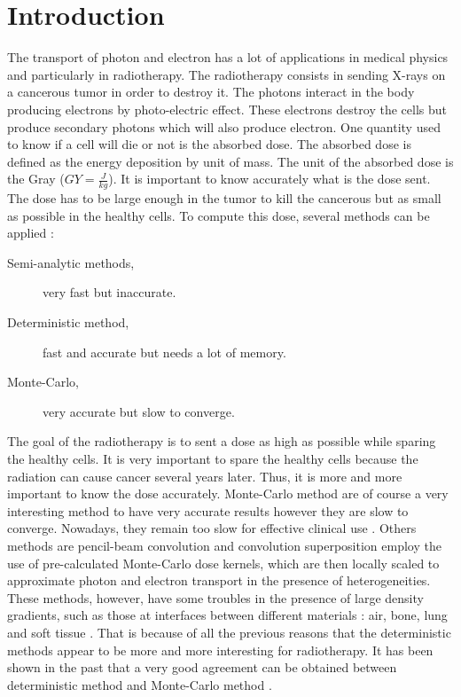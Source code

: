 \section{Introduction}
The transport of photon and electron has a lot of applications in medical
physics and particularly in radiotherapy. The radiotherapy consists in sending
X-rays on a cancerous tumor in order to destroy it. The photons interact in the
body producing electrons by photo-electric effect. These electrons destroy the
cells but produce secondary photons which will also produce electron. One
quantity used to know if a cell will die or not is the absorbed dose. The
absorbed dose is defined as the energy deposition by unit of mass. The unit of the 
absorbed dose is the Gray ($GY=\frac{J}{kg}$). It is important to know accurately what
is the dose sent. The dose has to be large enough in the tumor to kill the
cancerous but as small as possible in the healthy cells. To compute this dose,
several methods can be applied :
\begin{description}
\item[Semi-analytic methods,] very fast but inaccurate.
\item[Deterministic method,] fast and accurate but needs a lot of memory.
\item[Monte-Carlo,] very accurate but slow to converge.
\end{description}
The goal of the radiotherapy is to sent a dose as high as possible while
sparing the healthy cells. It is very important to spare the healthy cells
because the radiation can cause cancer several years later. Thus, it is more
and more important to know the dose accurately. Monte-Carlo method are of
course a very interesting method to have very accurate results however they
are slow to converge. Nowadays, they remain too slow for effective clinical
use \cite{acuros}. Others methods are pencil-beam convolution and
convolution superposition employ the use of pre-calculated Monte-Carlo dose
kernels, which are then locally scaled to approximate photon and electron
transport in the presence of heterogeneities. These methods, however, have
some troubles in the presence of large density gradients, such as those at
interfaces between different materials : air, bone, lung and soft tissue 
\cite{acuros}. That is because of all the previous reasons that the
deterministic methods appear to be more and more interesting for radiotherapy. 
It has been shown in the past  that a very good agreement can be obtained
between deterministic method and Monte-Carlo method \cite{acuros}.\\
